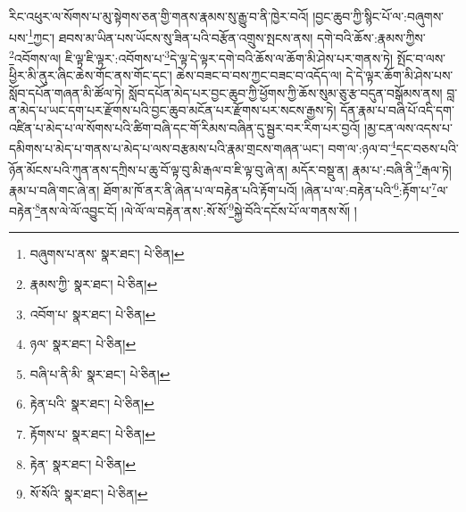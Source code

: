 རིང་འཕུར་ལ་སོགས་པ་མུ་སྟེགས་ཅན་གྱི་གནས་རྣམས་སུ་རྒྱུ་བ་ནི་ཁྱེར་བའོ། །བྱང་ཆུབ་ཀྱི་སྙིང་པོ་ལ་:བཞུགས་པས་\footnote{བཞུགས་པ་ནས་  སྣར་ཐང་།  པེ་ཅིན། }ཀྱང་། ཐབས་མ་ཡིན་པས་ཡོངས་སུ་ཟིན་པའི་བརྩོན་འགྲུས་སྤངས་ནས། དགེ་བའི་ཆོས་:རྣམས་ཀྱིས་\footnote{རྣམས་ཀྱི་  སྣར་ཐང་།  པེ་ཅིན། }འབོགས་ལ། ཇི་ལྟ་ཇི་ལྟར་:འབོགས་པ་\footnote{འབོག་པ་  སྣར་ཐང་།  པེ་ཅིན། }དེ་ལྟ་དེ་ལྟར་དགེ་བའི་ཆོས་ལ་ཆོག་མི་ཤེས་པར་གནས་ཏེ། སྤོང་བ་ལས་ཕྱིར་མི་ནུར་ཞིང་ཆེས་གོང་ནས་གོང་དང་། ཆེས་བཟང་བ་བས་ཀྱང་བཟང་བ་འདོད་ལ། དེ་དེ་ལྟར་ཆོག་མི་ཤེས་པས་སློབ་དཔོན་གཞན་མི་ཚོལ་ཏེ། སློབ་དཔོན་མེད་པར་བྱང་ཆུབ་ཀྱི་ཕྱོགས་ཀྱི་ཆོས་སུམ་ཅུ་རྩ་བདུན་བསྒོམས་ནས། བླ་ན་མེད་པ་ཡང་དག་པར་རྫོགས་པའི་བྱང་ཆུབ་མངོན་པར་རྫོགས་པར་སངས་རྒྱས་ཏེ། དོན་རྣམ་པ་བཞི་པོ་འདི་དག་འཛིན་པ་མེད་པ་ལ་སོགས་པའི་ཚིག་བཞི་དང་གོ་རིམས་བཞིན་དུ་སྦྱར་བར་རིག་པར་བྱའོ། །མྱ་ངན་ལས་འདས་པ་དམིགས་པ་མེད་པ་གནས་པ་མེད་པ་ལས་བརྩམས་པའི་རྣམ་གྲངས་གཞན་ཡང་། བག་ལ་:ཉལ་བ་\footnote{ཉལ་  སྣར་ཐང་།  པེ་ཅིན། }དང་བཅས་པའི་ཉོན་མོངས་པའི་ཀུན་ནས་དཀྲིས་པ་ཆུ་བོ་ལྟ་བུ་མི་རྒལ་བ་ཇི་ལྟ་བུ་ཞེ་ན། མདོར་བསྡུ་ན། རྣམ་པ་:བཞི་ནི་\footnote{བཞི་པ་ནི་མི་  སྣར་ཐང་།  པེ་ཅིན། }རྒལ་ཏེ། རྣམ་པ་བཞི་གང་ཞེ་ན། ཐོག་མ་ཁོ་ནར་ནི་ཞེན་པ་ལ་བརྟེན་པའི་རྟོག་པའོ། །ཞེན་པ་ལ་:བརྟེན་པའི་\footnote{རྟེན་པའི་  སྣར་ཐང་།  པེ་ཅིན། }:རྟོག་པ་\footnote{རྟོགས་པ་  སྣར་ཐང་།  པེ་ཅིན། }ལ་བརྟེན་\footnote{རྟེན་  སྣར་ཐང་།  པེ་ཅིན། }ནས་ལེ་ལོ་འབྱུང་ངོ། །ལེ་ལོ་ལ་བརྟེན་ནས་:སོ་སོ་\footnote{སོ་སོའི་  སྣར་ཐང་།  པེ་ཅིན། }སྐྱེ་བོའི་དངོས་པོ་ལ་གནས་སོ། །
